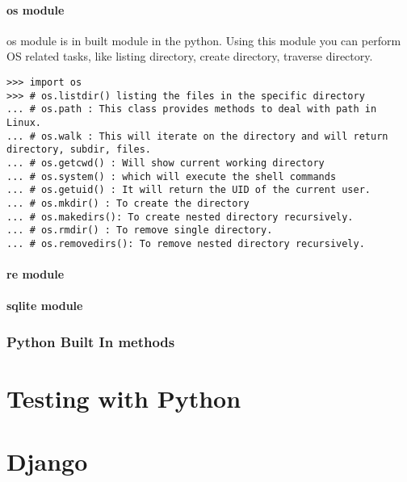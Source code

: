 \documentclass[letterpaper,12pt]{book}
\begin{document}
\subsection{os module}
os module is in built module in the python. Using this module you can perform OS related tasks, like listing directory, create directory, traverse directory.
\begin{verbatim}
>>> import os
>>> # os.listdir() listing the files in the specific directory
... # os.path : This class provides methods to deal with path in Linux.
... # os.walk : This will iterate on the directory and will return directory, subdir, files.
... # os.getcwd() : Will show current working directory
... # os.system() : which will execute the shell commands
... # os.getuid() : It will return the UID of the current user.
... # os.mkdir() : To create the directory
... # os.makedirs(): To create nested directory recursively.
... # os.rmdir() : To remove single directory.
... # os.removedirs(): To remove nested directory recursively.

\end{verbatim}
\subsection{re module}
\subsection{sqlite module}
\section{Python Built In methods}
\part{Testing with Python}
\part{Django}
\end{document}
